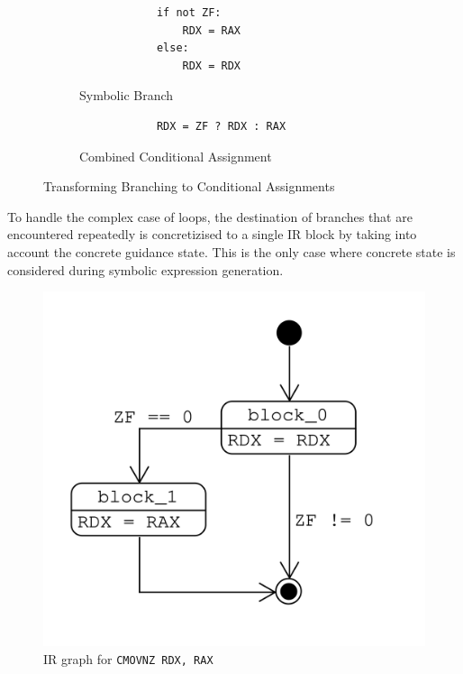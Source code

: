 \begin{figure}[htpb]
    \begin{subfigure}[b]{0.3\linewidth}
        \begin{lstlisting}
            if not ZF:
                RDX = RAX
            else:
                RDX = RDX
        \end{lstlisting}
        \caption{Symbolic Branch}\label{fig:symb_conditional_1}
    \end{subfigure}
    \hfill
    \begin{subfigure}[b]{0.5\linewidth}
        \begin{lstlisting}
            RDX = ZF ? RDX : RAX
        \end{lstlisting}
        \caption{Combined Conditional Assignment}\label{fig:symb_conditional_2}
    \end{subfigure}
    \caption{Transforming Branching to Conditional Assignments}
    \label{fig:symb_branch_to_assign}
\end{figure}

To handle the complex case of loops, the destination of branches that are encountered repeatedly is concretizised to a
single IR block by taking into account the concrete guidance state. This is the only case where concrete state is
considered during symbolic expression generation.

\begin{figure}[htpb]
    \centering
    \includegraphics[width=0.5\linewidth]{figures/ir_graph_cmov.png}
    \caption{IR graph for \texttt{CMOVNZ RDX, RAX}}\label{fig:ir_graph_cmov}
\end{figure}


